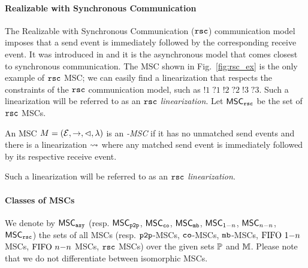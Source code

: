 \paragraph{\bf Realizable with Synchronous Communication}
The Realizable with Synchronous Communication ($\mathtt{rsc}$) communication model imposes that a send event is  immediately followed by the corresponding receive event. It was introduced in \cite{DBLP:journals/dc/Charron-BostMT96} and it is the asynchronous model that comes closest to synchronous communication. %
The MSC shown in Fig.~\ref{fig:rsc_ex} is the only example of $\mathtt{rsc}$ MSC; we can easily find a linearization that respects the constraints of the $\mathtt{rsc}$ communication model, such as $!1\;?1\;!2\;?2\;!3\;?3$. Such a linearization will be referred to as an \emph{$\mathtt{rsc}$ linearization}. Let $\mathsf{MSC}_{\mathtt{rsc}}$ be the set of $\mathtt{rsc}$ MSCs.

\begin{definition}\label{def:rsc}
	An MSC $M = (\mathcal{E},\to,\lhd,\lambda)$ is an \emph{\rsc-MSC} if it has no unmatched send events and there is a linearization $\rightsquigarrow$ where any matched send event is immediately followed by its respective receive event.
\end{definition}

Such a linearization will be referred to as an \emph{$\mathtt{rsc}$ linearization}.


\paragraph*{Classes of MSCs} 
We denote by $\mathsf{MSC}_{\mathtt{asy}}$ (resp. $\mathsf{MSC}_{\mathtt{p2p}}$, $\mathsf{MSC}_{\mathtt{co}}$, $\mathsf{MSC}_{\mathtt{mb}}$, $\mathsf{MSC}_{1\mathsf{-}n}$, $\mathsf{MSC}_{n\mathsf{-}n}$, $\mathsf{MSC}_{\mathtt{rsc}}$) the sets of all MSCs (resp. $\mathtt{p2p}$-MSCs, $\mathtt{co}$-MSCs, $\mathtt{mb}$-MSCs, $\text{FIFO } 1\mathsf{-}n$ MSCs, $\text{FIFO } n\mathsf{-}n$ MSCs, $\mathtt{rsc}$ MSCs) over the given sets $\mathbb{P}$ and $\mathbb{M}$. Please note that we do not differentiate between isomorphic MSCs.
